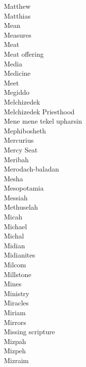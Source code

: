 Matthew  \\
Matthias  \\
Mean  \\
Measures  \\
Meat  \\
Meat offering  \\
Media  \\
Medicine  \\
Meet  \\
Megiddo  \\
Melchizedek  \\
Melchizedek Priesthood  \\
Mene mene tekel upharsin  \\
Mephibosheth  \\
Mercurius  \\
Mercy Seat  \\
Meribah  \\
Merodach-baladan  \\
Mesha  \\
Mesopotamia  \\
Messiah  \\
Methuselah  \\
Micah  \\
Michael  \\
Michal  \\
Midian  \\
Midianites  \\
Milcom  \\
Millstone  \\
Mines  \\
Ministry  \\
Miracles  \\
Miriam  \\
Mirrors  \\
Missing scripture  \\
Mizpah  \\
Mizpeh  \\
Mizraim  \\
